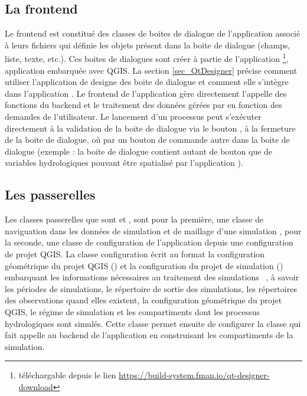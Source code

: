\subsection{La frontend}
Le frontend est constitué des classes de boites de dialogue de l'application associé à leurs fichiers  qui définie les objets  présent dans la boite de dialogue (champs, liste, texte, etc.). Ces boites de dialogues sont créer à partie de l'application \footnote{téléchargable depuis le lien \href{https://build-system.fman.io/qt-designer-download}{https://build-system.fman.io/qt-designer-download}}, application embarquée avec QGIS. La section \ref{sec_QtDesigner} précise comment utiliser l'application de designe des boite de dialogue et comment elle s'intègre dans l'application \cwv. Le frontend de l'application gère directement l'appelle des fonctions du backend et le traitement des données gérées par  en fonction des demandes de l'utilisateur. Le lancement d'un processus peut s’exécuter directement à la validation de la boite de dialogue via le bouton , à la fermeture de la boite de dialogue, où par un bouton de commande autre dans la boite de dialogue (exemple : la boite de dialogue  contient autant de bouton que de variables hydrologiques pouvant être spatialisé par l'application \cws). 

\subsection{Les passerelles}
Les classes passerelles que sont  et , sont pour la première, une classe de naviguation dans les données de simulation et de maillage d'une simulation \cws, pour la seconde, une classe de configuration de l'application \cws depuis une configuration de projet QGIS. La classe configuration écrit au format  la configuration géométrique du projet QGIS () et  la configuration du projet de simulation () embarquant les informations nécessaires au traitement des simulations \cws~, à savoir les périodes de simulations, le répertoire de sortie des simulations, les répertoires des observations quand elles existent, la configuration géométrique du projet QGIS, le régime de simulation et les compartiments dont les processus hydrologiques sont simulés. Cette classe permet ensuite de configurer la classe  qui fait appelle au backend de l'application en construisant les compartiments de la simulation. 

